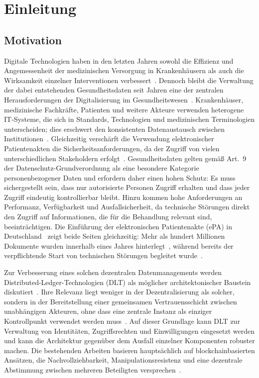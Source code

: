 \chapter{Einleitung}
\label{cha:einleitung}

\section{Motivation}
\label{sec:einleitung-motivation}

Digitale Technologien haben in den letzten Jahren sowohl die Effizienz und Angemessenheit der medizinischen Versorgung in Krankenhäusern als auch die Wirksamkeit einzelner Interventionen verbessert~\cite{ibrahim2022, keasberry2017}. Dennoch bleibt die Verwaltung der dabei entstehenden Gesundheitsdaten seit Jahren eine der zentralen Herausforderungen der Digitalisierung im Gesundheitswesen~\cite{stachwitz2023, bratan2022}. Krankenhäuser, medizinische Fachkräfte, Patienten und weitere Akteure verwenden heterogene IT-Systeme, die sich in Standards, Technologien und medizinischen Terminologien unterscheiden; dies erschwert den konsistenten Datenaustausch zwischen Institutionen~\cite{adel2022, torabmiandoab2023}. Gleichzeitig verschärft die Verwendung elektronischer Patientenakten die Sicherheitsanforderungen, da der Zugriff von vielen unterschiedlichen Stakeholdern erfolgt~\cite{mehrotra2013}. Gesundheitsdaten gelten gemäß Art.~9 der Datenschutz-Grundverordnung als eine besondere Kategorie personenbezogener Daten und erfordern daher einen hohen Schutz: Es muss sichergestellt sein, dass nur autorisierte Personen Zugriff erhalten und dass jeder Zugriff eindeutig kontrollierbar bleibt. Hinzu kommen hohe Anforderungen an Performanz, Verfügbarkeit und Ausfallsicherheit, da technische Störungen direkt den Zugriff auf Informationen, die für die Behandlung relevant sind, beeinträchtigen. Die Einführung der elektronischen Patientenakte (ePA) in Deutschland~\cite{bmg2026} zeigt beide Seiten gleichzeitig: Mehr als hundert Millionen Dokumente wurden innerhalb eines Jahres hinterlegt~\cite{gematik2026}, während bereits der verpflichtende Start von technischen Störungen begleitet wurde~\cite{apothekeadhoc2025}.

Zur Verbesserung eines solchen dezentralen Datenmanagements werden Distributed-Ledger-Technologien (DLT) als möglicher architektonischer Baustein diskutiert~\cite{ferreira2024}. Ihre Relevanz liegt weniger in der Dezentralisierung als solcher, sondern in der Bereitstellung einer gemeinsamen Vertrauensschicht zwischen unabhängigen Akteuren, ohne dass eine zentrale Instanz als einziger Kontrollpunkt verwendet werden muss~\cite{ferdous2020}. Auf dieser Grundlage kann DLT zur Verwaltung von Identitäten, Zugriffsrechten und Einwilligungen eingesetzt werden und kann die Architektur gegenüber dem Ausfall einzelner Komponenten robuster machen. Die bestehenden Arbeiten basieren hauptsächlich auf blockchainbasierten Ansätzen, die Nachvollziehbarkeit, Manipulationsresistenz und eine dezentrale Abstimmung zwischen mehreren Beteiligten versprechen~\cite{sonkamble2021, reegu2023}.

